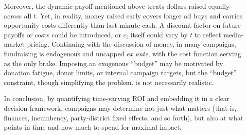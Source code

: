 Moreover, the dynamic payoff mentioned above treats dollars raised equally across all $t$. Yet, in reality, money raised early covers longer ad buys and carries opportunity costs differently than last-minute cash. A discount factor on future payoffs or costs could be introduced, or $c_i$ itself could vary by $t$ to reflect media-market pricing. Continuing with the discussion of money, in many campaigns, fundraising is endogenous and uncapped \textit{ex ante}, with the cost function serving as the only brake. Imposing an exogenous ``budget'' may be motivated by donation fatigue, donor limits, or internal campaign targets, but the ``budget'' constraint, though simplifying the problem, is not necessarily realistic.


In conclusion, by quantifying time-varying ROI and embedding it in a clear decision framework, campaigns may determine not just what matters (that is, finances, incumbency, party-district fixed effects, and so forth), but also at what points in time and how much to spend for maximal impact. 

\newpage
